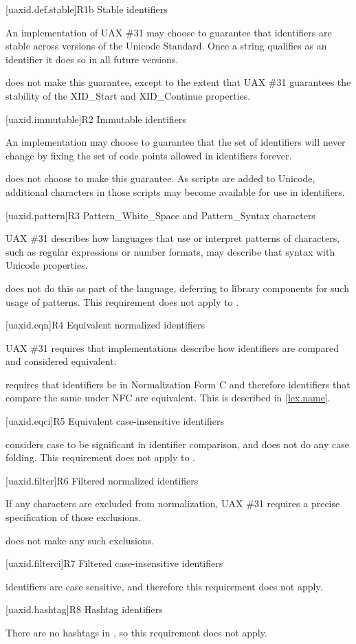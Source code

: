 [uaxid.def.stable]{R1b Stable identifiers}

\pnum
An implementation of UAX \#31 may choose to guarantee
that identifiers are stable across versions of the Unicode Standard.
Once a string qualifies as an identifier it does so in all future versions.

\pnum
\Cpp{} does not make this guarantee,
except to the extent that UAX \#31 guarantees
the stability of the XID_Start and XID_Continue properties.

[uaxid.immutable]{R2 Immutable identifiers}

\pnum
An implementation may choose to guarantee that
the set of identifiers will never change
by fixing the set of code points allowed in identifiers forever.

\pnum
\Cpp{} does not choose to make this guarantee.
As scripts are added to Unicode,
additional characters in those scripts may become available
for use in identifiers.

[uaxid.pattern]{R3 Pattern_White_Space and Pattern_Syntax characters}

\pnum
UAX \#31 describes how languages that use or interpret patterns of characters,
such as regular expressions or number formats,
may describe that syntax with Unicode properties.

\pnum
\Cpp{} does not do this as part of the language,
deferring to library components for such usage of patterns.
This requirement does not apply to \Cpp{}.

[uaxid.eqn]{R4 Equivalent normalized identifiers}

\pnum
UAX \#31 requires that implementations describe
how identifiers are compared and considered equivalent.

\pnum
\Cpp{} requires that identifiers be in Normalization Form C and
therefore identifiers that compare the same under NFC are equivalent.
This is described in \ref{lex.name}.

[uaxid.eqci]{R5 Equivalent case-insensitive identifiers}

\pnum
\Cpp{} considers case to be significant in identifier comparison, and
does not do any case folding.
This requirement does not apply to \Cpp{}.

[uaxid.filter]{R6 Filtered normalized identifiers}

\pnum
If any characters are excluded from normalization,
UAX \#31 requires a precise specification of those exclusions.

\pnum
\Cpp{} does not make any such exclusions.

[uaxid.filterci]{R7 Filtered case-insensitive identifiers}

\pnum
\Cpp{} identifiers are case sensitive, and
therefore this requirement does not apply.

[uaxid.hashtag]{R8 Hashtag identifiers}

\pnum
There are no hashtags in \Cpp{}, so this requirement does not apply.

